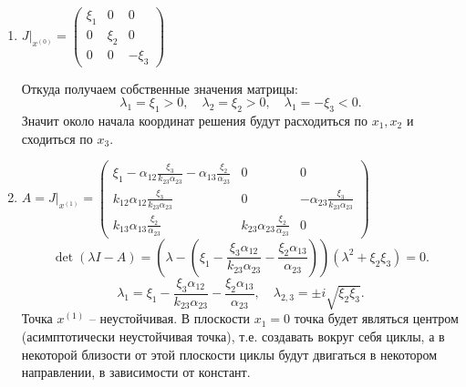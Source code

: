     \begin{enumerate}
        \item \(
            J \big|_{x^{(0)}} = \left(\begin{matrix}
                \xi_1 & 0 & 0 \\
                0 & \xi_2 & 0 \\
                0 & 0  & -\xi_3
            \end{matrix}\right)
        \)

        Откуда получаем собственные значения матрицы: 
        \[
            \lambda_1 = \xi_1 > 0, \quad \lambda_2 = \xi_2 > 0, \quad \lambda_1 = -\xi_3 < 0.
        \]
        Значит около начала координат решения будут расходиться по \( x_1, x_2 \) и сходиться по \( x_3 \).

        \item \(
            A = J \big|_{x^{(1)}} = \left(\begin{matrix}
                \xi_1 - \alpha_{12} \frac{\xi_3}{k_{23} \alpha_{23}} - \alpha_{13} \frac{\xi_2}{\alpha_{23}} & 0 & 0 \\[10pt]
                k_{12} \alpha_{12} \frac{\xi_3}{k_{23} \alpha_{23}} & 0 & -\alpha_{23} \frac{\xi_3}{k_{23} \alpha_{23}} \\[10pt]
                k_{13} \alpha_{13} \frac{\xi_2}{\alpha_{23}} & k_{23} \alpha_{23} \frac{\xi_2}{\alpha_{23}}  & 0
            \end{matrix}\right)
        \)
        \[
            \det(\lambda I - A) = \left(\lambda - \left(\xi_1 - \frac{\xi_3 \alpha_{12} }{k_{23} \alpha_{23}} - \frac{\xi_2 \alpha_{13}}{\alpha_{23}} \right) \right)(\lambda^2 + \xi_2 \xi_3) = 0.
        \]
        \[
            \lambda_1 = \xi_1 - \frac{\xi_3 \alpha_{12} }{k_{23} \alpha_{23}} - \frac{\xi_2 \alpha_{13}}{\alpha_{23}} , \quad \lambda_{2,3} = \pm i \sqrt{\xi_2 \xi_3}.
        \]
        Точка \( x^{(1)} \) -- неустойчивая. В плоскости \( x_1 = 0 \) точка будет являться центром (асимптотически неустойчивая точка), т.е. создавать вокруг себя циклы, а в некоторой близости от этой плоскости циклы будут двигаться в некотором направлении, в зависимости от констант.


\end{enumerate}
